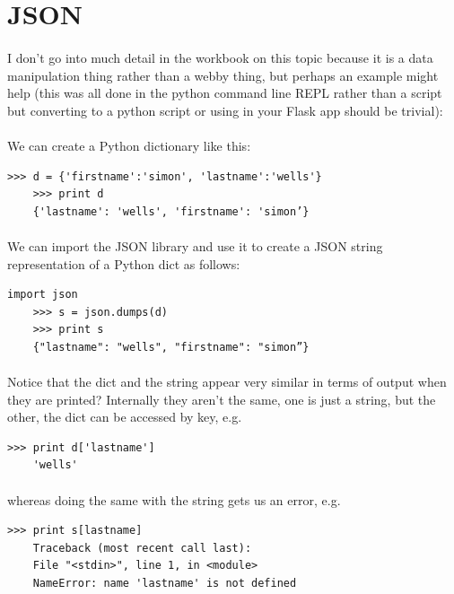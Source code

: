 \documentclass[12pt, a4paper, oneside]{book}
\begin{document}
\section{JSON}
\label{json}
\paragraph{} I don’t go into much detail in the workbook on this topic because it is a data manipulation thing rather than a webby thing, but perhaps an example might help (this was all done in the python command line REPL rather than a script but converting to a python script or using in your Flask app should be trivial):

\paragraph{} We can create a Python dictionary like this:
\begin{lstlisting}[style=DOS]
    >>> d = {'firstname':'simon', 'lastname':'wells'}
    >>> print d
    {'lastname': 'wells', 'firstname': 'simon’}
\end{lstlisting}

\paragraph{} We can import the JSON library and use it to create a JSON string representation of a Python dict as follows:
\begin{lstlisting}[style=DOS]
import json
    >>> s = json.dumps(d)
    >>> print s
    {"lastname": "wells", "firstname": "simon”}
\end{lstlisting}

\paragraph{} Notice that the dict and the string appear very similar in terms of output when they are printed? Internally they aren’t the same, one is just a string, but the other, the dict can be accessed by key, e.g.
\begin{lstlisting}[style=DOS]
    >>> print d['lastname']
    'wells'
\end{lstlisting}

\paragraph{} whereas doing the same with the string gets us an error, e.g.
\begin{lstlisting}[style=DOS]
    >>> print s[lastname]
    Traceback (most recent call last):
    File "<stdin>", line 1, in <module>
    NameError: name 'lastname' is not defined
\end{lstlisting}
\end{document}
